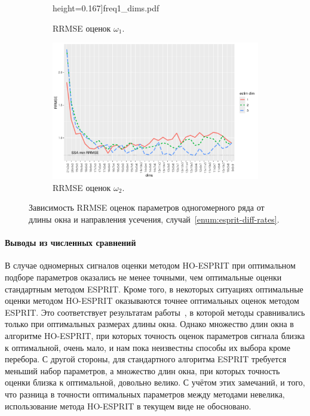 \documentclass[specialist,
  substylefile=spbu_report.rtx,
subf,href,colorlinks=true, 12pt]{disser}
\theoremstyle{plain}
\theoremstyle{definition}
\theoremstyle{remark}
\begin{document}
\begin{figure}[!ht]
\begin{subfigure}{0.49\linewidth}
    height=0.167\textheight]{freq1_dims.pdf}
    \caption{RRMSE оценок $\omega_1$.}
    \label{fig:freq1_dims}
  \end{subfigure}
  \begin{subfigure}{0.49\linewidth}
    \includegraphics[width=\linewidth,
    height=0.167\textheight]{freq2_dims.pdf}
    \caption{RRMSE оценок $\omega_2$.}
    \label{fig:freq2_dims}
  \end{subfigure}
  \caption{Зависимость RRMSE оценок параметров одногомерного ряда
    от длины окна и направления усечения,
  случай~\ref{enum:esprit-diff-rates}.}
  \label{fig:dims_diff_rates}
\end{figure}

\paragraph{Выводы из численных сравнений}
В случае одномерных сигналов оценки методом HO-ESPRIT при оптимальном
подборе параметров
оказались не менее точными, чем оптимальные оценки стандартным методом ESPRIT.
Кроме того, в некоторых ситуациях оптимальные оценки методом
HO-ESPRIT оказываются точнее
оптимальных оценок методом ESPRIT.
Это соответствует результатам работы~\cite{hosvd-hooi-separation}, в
которой методы
сравнивались только при оптимальных размерах длины окна.
Однако множество длин окна в алгоритме HO-ESPRIT, при которых
точность оценок параметров сигнала
близка к оптимальной, очень мало, и нам пока неизвестны способы их
выбора кроме перебора.
С другой стороны, для стандартного алгоритма ESPRIT требуется меньший
набор параметров,
а множество длин окна, при которых точность оценки близка к
оптимальной, довольно велико.
С учётом этих замечаний, и того, что разница в точности оптимальных
параметров между методами невелика, использование метода HO-ESPRIT в
текущем виде
не обосновано.
\end{document}
